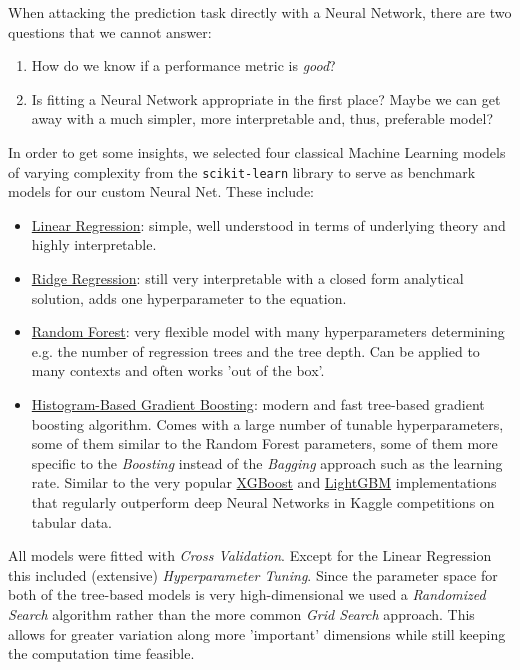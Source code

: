 When attacking the prediction task directly with a Neural Network, there are two questions that we cannot answer:
\begin{enumerate}
  \item How do we know if a performance metric is \emph{good}?
  \item Is fitting a Neural Network appropriate in the first place?
        Maybe we can get away with a much simpler, more interpretable and, thus, preferable model?
\end{enumerate}
In order to get some insights, we selected four classical Machine Learning models of varying complexity from the \texttt{scikit-learn} library \citep{pedregosa2011} to serve as benchmark models for our custom Neural Net.
These include:
\begin{itemize}
  \item \href{https://scikit-learn.org/stable/modules/generated/sklearn.linear_model.LinearRegression.html}{Linear Regression}: simple, well understood in terms of underlying theory and highly interpretable.
  \item \href{https://scikit-learn.org/stable/modules/generated/sklearn.linear_model.Ridge.html}{Ridge Regression}: still very interpretable with a closed form analytical solution, adds one hyperparameter to the equation.
  \item \href{https://scikit-learn.org/stable/modules/generated/sklearn.ensemble.RandomForestRegressor.html}{Random Forest}: very flexible model with many hyperparameters determining e.g. the number of regression trees and the tree depth.
        Can be applied to many contexts and often works 'out of the box'.
  \item \href{https://scikit-learn.org/stable/modules/generated/sklearn.ensemble.HistGradientBoostingRegressor.html}{Histogram-Based Gradient Boosting}: modern and fast tree-based gradient boosting algorithm.
        Comes with a large number of tunable hyperparameters, some of them similar to the Random Forest parameters, some of them more specific to the \emph{Boosting} instead of the \emph{Bagging} approach such as the learning rate.
        Similar to the very popular \href{https://xgboost.readthedocs.io/en/stable/}{XGBoost} \citep{chen2016} and \href{https://lightgbm.readthedocs.io/en/latest/}{LightGBM} \citep{ke2017} implementations that regularly outperform deep Neural Networks in Kaggle competitions on tabular data.
\end{itemize}

All models were fitted with \emph{Cross Validation}.
Except for the Linear Regression this included (extensive) \emph{Hyperparameter Tuning}.
Since the parameter space for both of the tree-based models is very high-dimensional we used a \emph{Randomized Search} algorithm \citep{bergstra2012} rather than the more common \emph{Grid Search} approach.
This allows for greater variation along more 'important' dimensions while still keeping the computation time feasible.


